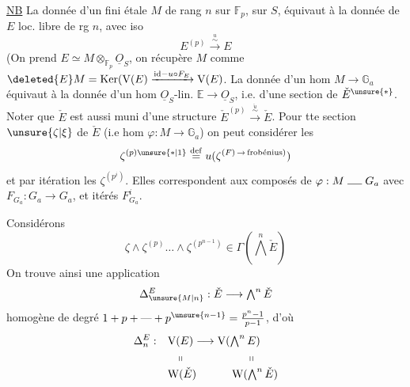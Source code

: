 
\uline{NB}  La donnée d'un  fini étale
 $M$ de rang $n$ sur $\mathbb F_p$, sur $S$, équivaut à la donnée de $E$ loc. libre de rg $n$, avec iso
\[
 E^{(p)}\xrightarrow{\overset{u}{\sim}}E
\]
(On prend $E\simeq M\otimes_{\mathbb F_p}\underline O_S$, on récupère $M$ comme
$\deleted{E}M=\operatorname{Ker}(\mathrm V(E)\xrightarrow{\mathrm{id}-u\circ F_E}\mathrm V(E)$.
La donnée d'un hom $M\longrightarrow\mathbb G_a$ équivaut à la donnée d'un hom
$\underline O_S$-lin. $\mathbb E\longrightarrow\underline O_S$, i.e. d'une section
 \deleted{\unsure{$\xi$}} de $\check E^{\unsure{*}}$.
Noter que $\check E$ est aussi muni d'une structure
$\check E^{(p)}\xrightarrow{\overset{\check u}{\sim}}\check E$.
Pour tte section $\unsure{\zeta|\xi}$ de $\check E$ (i.e hom $\varphi:M\to\mathbb G_a$) on peut considérer les 
\[
 \zeta^{(p)\unsure{*|1}}\overset{\mathrm{def}}{=}
 u(\zeta^{(F)\,\to\,\text{frobénius})})
\]
et par itération les $\zeta^{(p^i)}$. Elles correspondent aux composés de
$\varphi:M\mathrel{\rule{1.3em}{.4pt}}G_a$ avec $F_{G_a}:G_a\to G_a$,
et   itérés $F_{G_a}^{i}$.

Considérons
\[
 \zeta\wedge\zeta^{(p)}\ldots\wedge\zeta^{(p^{n-1})}
 \in\Gamma(\textstyle\bigwedge^n\check E)
\]
On trouve ainsi  une application 
\[
 \Delta^{E}_{\unsure{M|n}}:\check E\longrightarrow\textstyle\bigwedge^n\check E
\]
homogène de degré $1+p+\text{---}+p^{\unsure{n-1}}=\frac{p^n-1}{p-1}$, d'où
\[
 \begin{aligned}
 \Delta_{n}^E:\quad &\mathrm V(E)\longrightarrow \mathrm V(\textstyle\bigwedge^{n}E)\\
 &\hspace{.7em}\shortparallel \hspace{6em}\shortparallel\\[-2pt]
 &\mathrm W(\check E)\hspace{3.2em}\mathrm W(\textstyle\bigwedge^{n}\check E)
 \end{aligned}
\]

